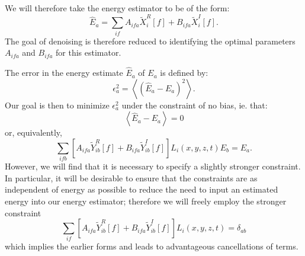 We will therefore take the energy estimator to be of the form:
\[ \widehat{E}_a = \sum_{if} A_{ifa} \widetilde{X}_i^R[f] + B_{ifa} \widetilde{X}_i^I[f].\]
The goal of denoising is therefore reduced to identifying the optimal parameters $A_{ifa}$ and $B_{ifa}$ for this estimator.

The error in the energy estimate $\widehat{E}_a$ of $E_a$ is defined by:
\[ \epsilon^2_a = \left< \left(\widehat{E}_a - E_a\right)^2\right>. \]
Our goal is then to minimize $\epsilon^2_a$ under the constraint of no bias, ie. that:
\[\left<\widehat{E}_a - E_a\right> = 0\]
or, equivalently,
\[\sum_{ifb}\left[A_{ifa} \widetilde{Y}_{ib}^R[f] + B_{ifa} \widetilde{Y}_{ib}^I[f]\right] L_i(x,y,z,t) E_b = E_a.\]
However, we will find that it is necessary to specify a slightly stronger constraint.  In particular, it will be desirable to ensure that the constraints are as independent of energy as possible to reduce the need to input an estimated energy into our energy estimator; therefore we will freely employ the stronger constraint
\[\sum_{if}\left[A_{ifa} \widetilde{Y}_{ib}^R[f] + B_{ifa} \widetilde{Y}_{ib}^I[f]\right] L_i(x,y,z,t) = \delta_{ab}\]
which implies the earlier forms and leads to advantageous cancellations of terms.

